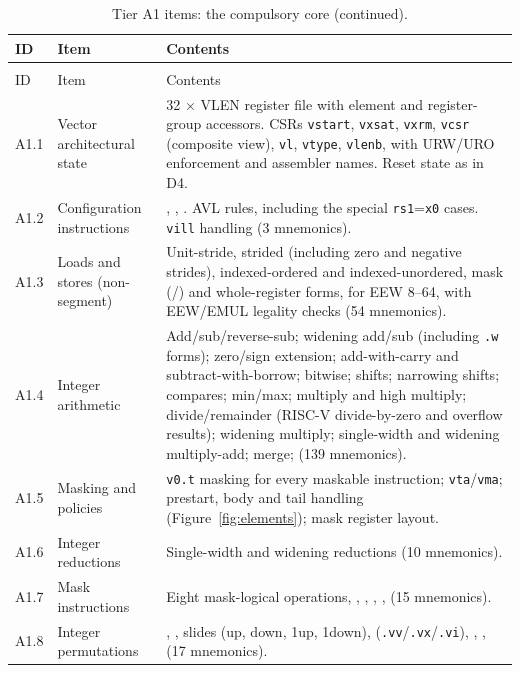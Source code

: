 \documentclass[11pt]{article}
\begin{document}
\small
\begin{longtable}{@{}L{1.0cm}L{3.4cm}L{10.7cm}@{}}
\caption{Tier A1 items: the compulsory core.}\label{tab:tierA1}\\
\toprule
ID & Item & Contents \\
\midrule
\endfirsthead
\caption[]{Tier A1 items: the compulsory core (continued).}\\
\toprule
ID & Item & Contents \\
\midrule
\endhead
A1.1 & Vector architectural state & 32 $\times$ VLEN register file with element and register-group accessors. CSRs \texttt{vstart}, \texttt{vxsat}, \texttt{vxrm}, \texttt{vcsr} (composite view), \texttt{vl}, \texttt{vtype}, \texttt{vlenb}, with URW/URO enforcement and assembler names. Reset state as in D4. \\
A1.2 & Configuration instructions & , , . AVL rules, including the special \texttt{rs1}=\texttt{x0} cases. \texttt{vill} handling (3 mnemonics). \\
A1.3 & Loads and stores (non-segment) & Unit-stride, strided (including zero and negative strides), indexed-ordered and indexed-unordered, mask (/) and whole-register forms, for EEW 8--64, with EEW/EMUL legality checks (54 mnemonics). \\
A1.4 & Integer arithmetic & Add/sub/reverse-sub; widening add/sub (including \texttt{.w} forms); zero/sign extension; add-with-carry and subtract-with-borrow; bitwise; shifts; narrowing shifts; compares; min/max; multiply and high multiply; divide/remainder (RISC-V divide-by-zero and overflow results); widening multiply; single-width and widening multiply-add; merge;  (139 mnemonics). \\
A1.5 & Masking and policies & \texttt{v0.t} masking for every maskable instruction; \texttt{vta}/\texttt{vma}; prestart, body and tail handling (Figure~\ref{fig:elements}); mask register layout. \\
A1.6 & Integer reductions & Single-width and widening reductions (10 mnemonics). \\
A1.7 & Mask instructions & Eight mask-logical operations, , , , ,  (15 mnemonics). \\
A1.8 & Integer permutations & , , slides (up, down, 1up, 1down),  (\texttt{.vv}/\texttt{.vx}/\texttt{.vi}), , ,  (17 mnemonics). \\

\end{longtable}
\end{document}

